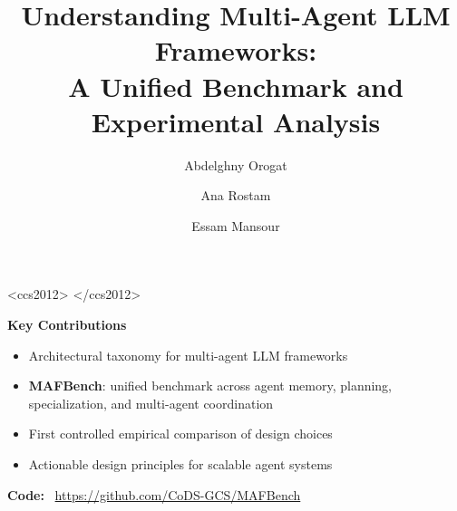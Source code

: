 \documentclass[sigconf,nonacm]{acmart}
\title[Understanding Multi-Agent LLM Frameworks]{%
Understanding Multi-Agent LLM Frameworks:\\
A Unified Benchmark and Experimental Analysis
}
\author{Abdelghny Orogat}
\affiliation{
  \institution{Concordia University}
  \country{Canada}
}
\author{Ana Rostam}
\affiliation{
  \institution{Concordia University}
  \country{Canada}
}
\author{Essam Mansour}
\affiliation{
  \institution{Concordia University}
  \country{Canada}
}
\begin{document}


\begin{CCSXML}
<ccs2012>
</ccs2012>
\end{CCSXML}

\vspace{-4mm}

\vspace{-2mm}

\maketitle

\begin{tcolorbox}[
colback=gray!6,
colframe=black!25,
boxrule=0.5pt,
arc=2pt,
left=4pt,right=4pt,top=4pt,bottom=4pt]
\noindent\textbf{Key Contributions}
\begin{itemize}[leftmargin=1.2em, nosep]
\item Architectural taxonomy for multi-agent LLM frameworks
\item \textbf{MAFBench}: unified benchmark across agent memory, planning, specialization, and multi-agent coordination
\item First controlled empirical comparison of design choices
\item Actionable design principles for scalable agent systems
\end{itemize}

\vspace{1mm}
\noindent\textbf{Code:} \faGithub\ 
\textcolor{darkblue}{\href{https://github.com/CoDS-GCS/MAFBench}{https://github.com/CoDS-GCS/MAFBench}}
\end{tcolorbox}









\begingroup
\hypersetup{colorlinks=true,urlcolor=blue}

% 

\endgroup

\appendix{}




\end{document}
